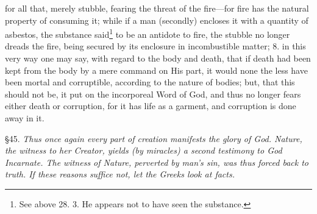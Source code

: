 for all that, merely stubble, fearing the threat of the fire—for fire has the natural property of consuming it; while if a man (secondly) encloses it with a quantity of asbestos, the substance said\footnote{See above 28. 3. He appears not to have seen the substance.} to be an antidote to fire, the stubble no longer dreads the fire, being secured by its enclosure in incombustible matter; 8. in this very way one may say, with regard to the body and death, that if death had been kept from the body by a mere command on His part, it would none the less have been mortal and corruptible, according to the nature of bodies; but, that this should not be, it put on the incorporeal Word of God, and thus no longer fears either death or corruption, for it has life as a garment, and corruption is done away in it.


§45. \emph{Thus once again every part of creation manifests the glory of God. Nature, the witness to her Creator, yields (by miracles) a second testimony to God Incarnate. The witness of Nature, perverted by man’s sin, was thus forced back to truth. If these reasons suffice not, let the Greeks look at facts.}

